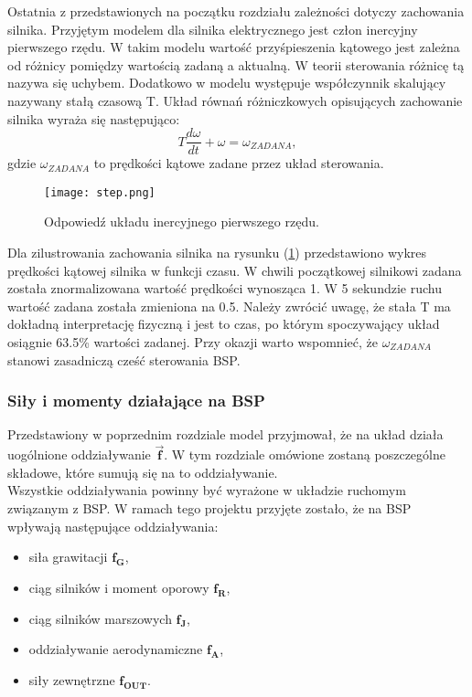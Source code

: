 Ostatnia z przedstawionych na początku rozdziału zależności dotyczy zachowania silnika. Przyjętym modelem dla silnika elektrycznego jest człon inercyjny pierwszego rzędu. W takim modelu wartość przyśpieszenia kątowego jest zależna od różnicy pomiędzy wartością zadaną a aktualną. W teorii sterowania różnicę tą nazywa się uchybem. Dodatkowo w modelu występuje współczynnik skalujący nazywany stałą czasową T. Układ równań różniczkowych opisujących zachowanie silnika wyraża się następująco:
 \[
	T \frac{d\omega}{dt} + \omega = \omega_{ZADANA},
\]
gdzie $\omega_{ZADANA}$ to prędkości kątowe zadane przez układ sterowania. 

\begin{figure}[!h]
   	\centering
      	\texttt{[image: step.png]}
      	\caption{Odpowiedź układu inercyjnego pierwszego rzędu.}
      	\label{rotor_step}
\end{figure}

Dla zilustrowania zachowania silnika na rysunku (\ref{rotor_step}) przedstawiono wykres prędkości kątowej silnika w funkcji czasu. W chwili początkowej silnikowi zadana została znormalizowana wartość prędkości wynosząca 1. W 5 sekundzie ruchu wartość zadana została zmieniona na 0.5. Należy zwrócić uwagę, że stała T ma dokładną interpretację fizyczną i jest to czas, po którym spoczywający układ osiągnie 63.5\% wartości zadanej. Przy okazji warto wspomnieć, że $\omega_{ZADANA}$ stanowi zasadniczą cześć sterowania BSP.

\subsubsection{Siły i momenty działające na BSP}

Przedstawiony w poprzednim rozdziale model przyjmował, że na układ działa uogólnione oddziaływanie $\bm{\vec{f}}$. W tym rozdziale omówione zostaną poszczególne składowe, które sumują się na to oddziaływanie.\\

Wszystkie oddziaływania powinny być wyrażone w układzie ruchomym związanym z BSP. W ramach tego projektu przyjęte zostało, że na BSP wpływają następujące oddziaływania:
\begin{itemize}
  \item {
    siła grawitacji  $\bm{f_G}$,
  }
  \item{   
    ciąg silników i moment oporowy  $\bm{f_R}$,
   }
    \item{   
    ciąg silników marszowych  $\bm{f_J}$,
   }
    \item{   
    oddziaływanie aerodynamiczne $\bm{f_A}$,
   }
    \item{   
   siły zewnętrzne $\bm{f_{OUT}}$.
   }
\end{itemize}

